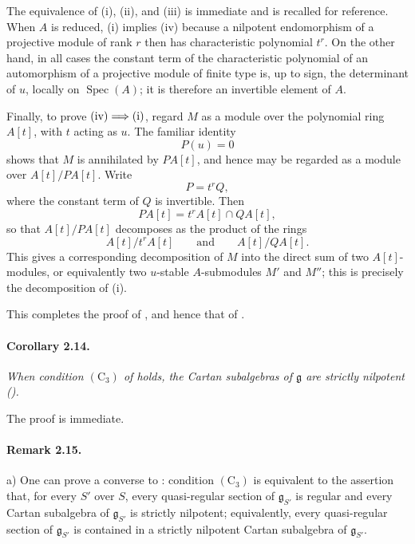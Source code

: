 The equivalence of \textup{(i)}, \textup{(ii)}, and \textup{(iii)}
is immediate and is recalled for reference. When \(A\) is reduced,
\textup{(i)} implies \textup{(iv)} because a nilpotent
endomorphism of a projective module of rank \(r\) then has
characteristic polynomial \(t^r\). On the other hand, in all cases
the constant term of the characteristic polynomial of an
automorphism of a projective module of finite type is, up to sign,
the determinant of \(u\), locally on \(\operatorname{Spec}(A)\);
it is therefore an invertible element of \(A\).

Finally, to prove
\(\textup{(iv)}\Longrightarrow\textup{(i)}\), regard \(M\) as a
module over the polynomial ring \(A[t]\), with \(t\) acting as
\(u\). The familiar identity
\[
  P(u)=0
\]
shows that \(M\) is annihilated by \(P A[t]\), and hence may be
regarded as a module over \(A[t]/P A[t]\). Write
\[
  P=t^rQ,
\]
where the constant term of \(Q\) is invertible. Then
\[
  P A[t]=t^rA[t]\cap Q A[t],
\]
so that \(A[t]/P A[t]\) decomposes as the product of the rings
\[
  A[t]/t^rA[t]
  \qquad\text{and}\qquad
  A[t]/Q A[t].
\]
This gives a corresponding decomposition of \(M\) into the direct
sum of two \(A[t]\)-modules, or equivalently two \(u\)-stable
\(A\)-submodules \(M'\) and \(M''\); this is precisely the
decomposition of \textup{(i)}.

This completes the proof of , and hence that of .



\paragraph{\textbf{Corollary 2.14.}}
\emph{When condition \((\mathrm C_3)\) of  holds, the Cartan
subalgebras of \(\mathfrak g\) are strictly nilpotent
\textup{()}.}

The proof is immediate.

\paragraph{\textbf{Remark 2.15.}}
\noindent
\textup{a)}
One can prove a converse to : condition \((\mathrm C_3)\) is
equivalent to the assertion that, for every \(S'\) over \(S\),
every quasi-regular section of \(\mathfrak g_{S'}\) is regular and
every Cartan subalgebra of \(\mathfrak g_{S'}\) is strictly
nilpotent; equivalently, every quasi-regular section of
\(\mathfrak g_{S'}\) is contained in a strictly nilpotent Cartan
subalgebra of \(\mathfrak g_{S'}\).

